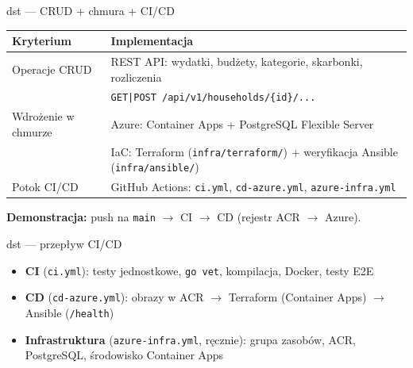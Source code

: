 \documentclass[aspectratio=169,11pt]{beamer}
\begin{document}
\begin{frame}{dst --- CRUD + chmura + CI/CD}
  \small
  \begin{tabular}{@{}p{}p{}@{}}
    \toprule
    \textbf{Kryterium} & \textbf{Implementacja} \\
    \midrule
    Operacje CRUD &
    REST API: wydatki, budżety, kategorie, skarbonki, rozliczenia \\
    & \texttt{GET|POST /api/v1/households/\{id\}/...} \\
    \addlinespace
    Wdrożenie w chmurze &
    Azure: Container Apps + PostgreSQL Flexible Server \\
    & IaC: Terraform (\texttt{infra/terraform/}) + weryfikacja Ansible (\texttt{infra/ansible/}) \\
    \addlinespace
    Potok CI/CD &
    GitHub Actions: \texttt{ci.yml}, \texttt{cd-azure.yml}, \texttt{azure-infra.yml} \\
    \bottomrule
  \end{tabular}

  \vspace{0.5em}
  \normalsize
  \textbf{Demonstracja:} push na \texttt{main} $\rightarrow$ CI $\rightarrow$ CD (rejestr ACR $\rightarrow$ Azure).
\end{frame}

\begin{frame}{dst --- przepływ CI/CD}
  \centering

  \vspace{0.8em}
  \begin{itemize}
    \item \textbf{CI} (\texttt{ci.yml}): testy jednostkowe, \texttt{go vet}, kompilacja, Docker, testy E2E
    \item \textbf{CD} (\texttt{cd-azure.yml}): obrazy w ACR $\rightarrow$ Terraform (Container Apps) $\rightarrow$ Ansible (\texttt{/health})
    \item \textbf{Infrastruktura} (\texttt{azure-infra.yml}, ręcznie): grupa zasobów, ACR, PostgreSQL, środowisko Container Apps
  \end{itemize}
\end{frame}
\end{document}
